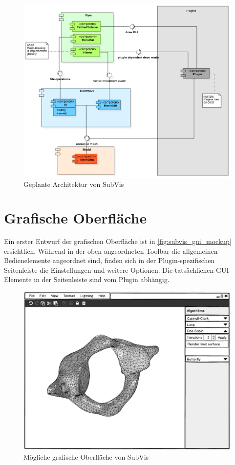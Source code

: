 \begin{figure}
  \centering
  \includegraphics[width=\textwidth]{content/media/subvis_architektur.png}
  \caption{Geplante Architektur von SubVis}
  \label{fig:subvis_architektur}
\end{figure}

\section{Grafische Oberfläche}

Ein erster Entwurf der grafischen Oberfläche ist in \autoref{fig:subvis_gui_mockup} ersichtlich.
Während in der oben angeordneten Toolbar die allgemeinen Bedienelemente angeordnet sind, finden sich in der Plugin-spezifischen Seitenleiste die Einstellungen und weitere Optionen.
Die tatsächlichen GUI-Elemente in der Seitenleiste sind vom Plugin abhängig.

 \begin{figure}[hp]
  \centering
  \includegraphics[width=\textwidth]{content/media/subvis_gui_mockup.png}
  \caption{Mögliche grafische Oberfläche von SubVis}
  \label{fig:subvis_gui_mockup}
\end{figure}

